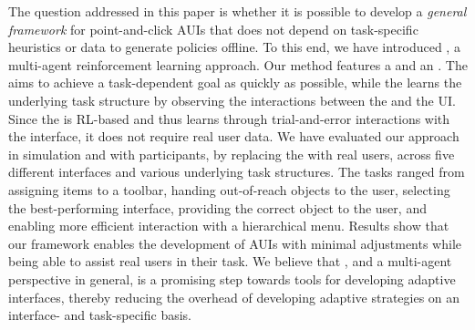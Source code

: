 
The question addressed in this paper is whether it is possible to develop a \emph{general framework} for point-and-click AUIs that does not depend on task-specific heuristics or data to generate policies offline. To this end, we have introduced \marlui, a multi-agent reinforcement learning approach. Our method features a \useragent and an \interfaceagent. The \useragent aims to achieve a task-dependent goal as quickly as possible, while the \interfaceagent learns the underlying task structure by observing the interactions between the \useragent and the UI. Since the \useragent is RL-based and thus learns through trial-and-error interactions with the interface, it does not require real user data. We have evaluated our approach in simulation and with participants, by replacing the \useragent with real users, across five different interfaces and various underlying task structures. The tasks ranged from assigning items to a toolbar, handing out-of-reach objects to the user, selecting the best-performing interface, providing the correct object to the user, and enabling more efficient interaction with a hierarchical menu. 
Results show that our framework enables the development of AUIs with minimal adjustments while being able to assist real users in their task.
We believe that \marlui, and a multi-agent perspective in general, is a promising step towards tools for developing adaptive interfaces, thereby reducing the overhead of developing adaptive strategies on an interface- and task-specific basis.
